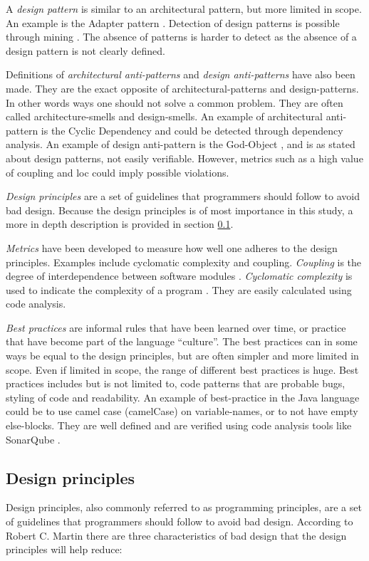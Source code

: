 \documentclass{article}
\begin{document}
A \textit{design pattern} is similar to an architectural pattern, but more limited in scope. An example is the Adapter pattern \cite{Adapterp54:online}. Detection of design patterns is possible through mining \cite{TEKIN2014406}. The absence of patterns is harder to detect as the absence of a design pattern is not clearly defined.

Definitions of \textit{architectural anti-patterns} and \textit{design anti-patterns} have also been made. They are the exact opposite of architectural-patterns and design-patterns. In other words ways one should not solve a common problem. They are often called architecture-smells and design-smells. An example of architectural anti-pattern is the Cyclic Dependency \cite{cyclicdependency} and could be detected through dependency analysis. An example of design anti-pattern is the God-Object \cite{Godobjec14:online}, and is as stated about design patterns, not easily verifiable. However, metrics such as a high value of coupling and \gls{loc} could imply possible violations.


\textit{Design principles} are a set of guidelines that programmers should follow to avoid bad design. Because the design principles is of most importance in this study, a more in depth description is provided in section \ref{design-principles}.

\textit{Metrics} have been developed to measure how well one adheres to the design principles. Examples include cyclomatic complexity and coupling. \textit{Coupling} is the degree of interdependence between software modules \cite{Coupling2:online}. \textit{Cyclomatic complexity} is used to indicate the complexity of a program \cite{Cyclomat54:online}. They are easily calculated using code analysis.

\textit{Best practices} are informal rules that have been learned over time, or practice that have become part of the language ``culture''. The best practices can in some ways be equal to the design principles, but are often simpler and more limited in scope. Even if limited in scope, the range of different best practices is huge. Best practices includes but is not limited to, code patterns that are probable bugs, styling of code and readability. An example of best-practice in the Java language could be to use camel case (camelCase) \cite{camelcase} on variable-names, or to not have empty else-blocks. They are well defined and are verified using code analysis tools like SonarQube \cite{sonarqube}.

\subsection{Design principles}
\label{design-principles}
Design principles, also commonly referred to as programming principles, are a set of guidelines that programmers should follow to avoid bad design. According to Robert C. Martin \cite{robertcmartinprinciples} there are three characteristics of bad design that the design principles will help reduce:
\end{document}
